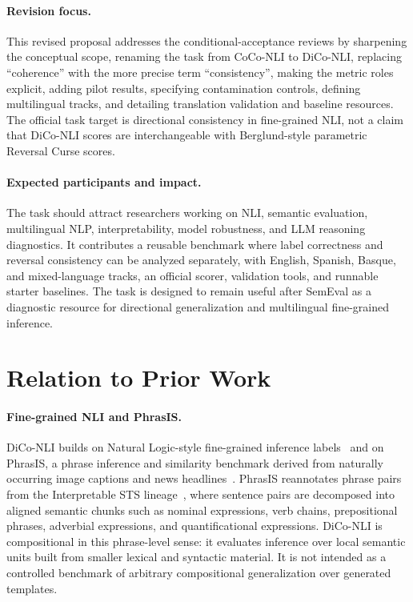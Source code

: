 \documentclass[11pt]{article}
\begin{document}
\paragraph{Revision focus.}
This revised proposal addresses the conditional-acceptance reviews by sharpening the conceptual scope, renaming the task from CoCo-NLI to DiCo-NLI, replacing ``coherence'' with the more precise term ``consistency'', making the metric roles explicit, adding pilot results, specifying contamination controls, defining multilingual tracks, and detailing translation validation and baseline resources.
The official task target is directional consistency in fine-grained NLI, not a claim that DiCo-NLI scores are interchangeable with Berglund-style parametric Reversal Curse scores.

\paragraph{Expected participants and impact.}
The task should attract researchers working on NLI, semantic evaluation, multilingual NLP, interpretability, model robustness, and LLM reasoning diagnostics.
It contributes a reusable benchmark where label correctness and reversal consistency can be analyzed separately, with English, Spanish, Basque, and mixed-language tracks, an official scorer, validation tools, and runnable starter baselines.
The task is designed to remain useful after SemEval as a diagnostic resource for directional generalization and multilingual fine-grained inference.

\section{Relation to Prior Work}

\paragraph{Fine-grained NLI and PhrasIS.}
DiCo-NLI builds on Natural Logic-style fine-grained inference labels~\cite{maccartney2009natural} and on PhrasIS, a phrase inference and similarity benchmark derived from naturally occurring image captions and news headlines~\cite{lopezgazpio2024phrasis}.
PhrasIS reannotates phrase pairs from the Interpretable STS lineage~\cite{lopezgazpio2017interpretable}, where sentence pairs are decomposed into aligned semantic chunks such as nominal expressions, verb chains, prepositional phrases, adverbial expressions, and quantificational expressions.
DiCo-NLI is compositional in this phrase-level sense: it evaluates inference over local semantic units built from smaller lexical and syntactic material.
It is not intended as a controlled benchmark of arbitrary compositional generalization over generated templates.
\end{document}
